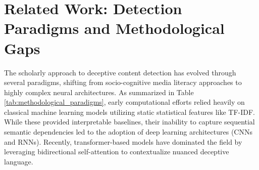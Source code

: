 \documentclass[informatics,article,submit,pdftex,moreauthors]{Definitions/mdpi}
\begin{document}
\section{Related Work: Detection Paradigms and Methodological Gaps}
The scholarly approach to deceptive content detection has evolved through several paradigms, shifting from socio-cognitive media literacy approaches to highly complex neural architectures. As summarized in Table \ref{tab:methodological_paradigms}, early computational efforts relied heavily on classical machine learning models utilizing static statistical features like TF-IDF. While these provided interpretable baselines, their inability to capture sequential semantic dependencies led to the adoption of deep learning architectures (CNNs and RNNs). Recently, transformer-based models have dominated the field by leveraging bidirectional self-attention to contextualize nuanced deceptive language. 
\end{document}
